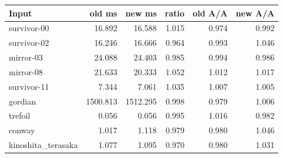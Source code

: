 \begin{center}\small
\begin{tabular}{@{}lrrrrr@{}}
\toprule
Input & old ms & new ms & ratio & old A/A & new A/A \\
\midrule
survivor-00 & 16.892 & 16.588 & 1.015 & 0.974 & 0.992 \\
survivor-02 & 16.246 & 16.666 & 0.964 & 0.993 & 1.046 \\
mirror-03 & 24.088 & 24.403 & 0.985 & 0.994 & 0.986 \\
mirror-08 & 21.633 & 20.333 & 1.052 & 1.012 & 1.017 \\
survivor-11 & 7.344 & 7.061 & 1.035 & 1.007 & 1.005 \\
gordian & 1500.813 & 1512.295 & 0.998 & 0.979 & 1.006 \\
trefoil & 0.056 & 0.056 & 0.995 & 1.016 & 0.982 \\
conway & 1.017 & 1.118 & 0.979 & 0.980 & 1.046 \\
kinoshita\_terasaka & 1.077 & 1.095 & 0.970 & 0.980 & 1.031 \\
\bottomrule
\end{tabular}
\end{center}
